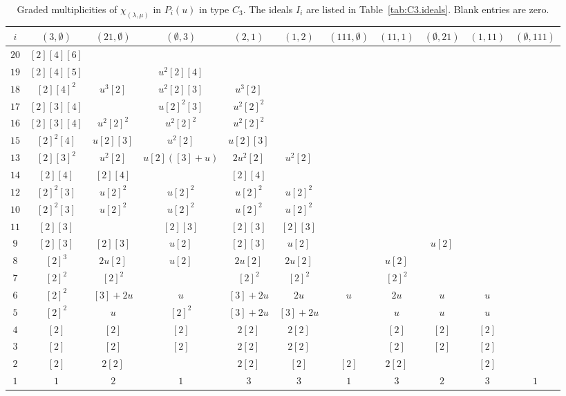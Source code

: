 \documentclass[11pt]{amsart}
\numberwithin{equation}{section}
\theoremstyle{definition}
\begin{document}
\begin{table}%
\centering
\footnotesize
\setlength{\tabcolsep}{2.6pt}
\renewcommand{\arraystretch}{1.2}
\begin{tabular}{@{}c*{10}{c}@{}}
\toprule
$i$&$(3,\emptyset)$&$(21,\emptyset)$&$(\emptyset,3)$&$(2,1)$&$(1,2)$&
$(111,\emptyset)$&$(11,1)$&$(\emptyset,21)$&$(1,11)$&$(\emptyset,111)$\\
\midrule
$20$ & $[2][4][6]$ &  &  &  &  &  &  &  &  & \\
$19$ & $[2][4][5]$ &  & $u^2[2][4]$ &  &  &  &  &  &  & \\
$18$ & $[2][4]^2$ & $u^3[2]$ & $u^2[2][3]$ & $u^3[2]$ &  &  &  &  &  & \\
$17$ & $[2][3][4]$ &  & $u[2]^2[3]$ & $u^2[2]^2$ &  &  &  &  &  & \\
$16$ & $[2][3][4]$ & $u^2[2]^2$ & $u^2[2]^2$ & $u^2[2]^2$ &  &  &  &  &  & \\
$15$ & $[2]^2[4]$ & $u[2][3]$ & $u^2[2]$ & $u[2][3]$ &  &  &  &  &  & \\
$13$ & $[2][3]^2$ & $u^2[2]$ & $u[2]([3]+u)$ & $2u^2[2]$ & $u^2[2]$ &  &  &  &  & \\
$14$ & $[2][4]$ & $[2][4]$ &  & $[2][4]$ &  &  &  &  &  & \\
$12$ & $[2]^2[3]$ & $u[2]^2$ & $u[2]^2$ & $u[2]^2$ & $u[2]^2$ &  &  &  &  & \\
$10$ & $[2]^2[3]$ & $u[2]^2$ & $u[2]^2$ & $u[2]^2$ & $u[2]^2$ &  &  &  &  & \\
$11$ & $[2][3]$ &  & $[2][3]$ & $[2][3]$ & $[2][3]$ &  &  &  &  & \\
$9$ & $[2][3]$ & $[2][3]$ & $u[2]$ & $[2][3]$ & $u[2]$ &  &  & $u[2]$ &  & \\
$8$ & $[2]^3$ & $2u[2]$ & $u[2]$ & $2u[2]$ & $2u[2]$ &  & $u[2]$ &  &  & \\
$7$ & $[2]^2$ & $[2]^2$ &  & $[2]^2$ & $[2]^2$ &  & $[2]^2$ &  &  & \\
$6$ & $[2]^2$ & $[3]+2u$ & $u$ & $[3]+2u$ & $2u$ & $u$ & $2u$ & $u$ & $u$ & \\
$5$ & $[2]^2$ & $u$ & $[2]^2$ & $[3]+2u$ & $[3]+2u$ &  & $u$ & $u$ & $u$ & \\
$4$ & $[2]$ & $[2]$ & $[2]$ & $2[2]$ & $2[2]$ &  & $[2]$ & $[2]$ & $[2]$ & \\
$3$ & $[2]$ & $[2]$ & $[2]$ & $2[2]$ & $2[2]$ &  & $[2]$ & $[2]$ & $[2]$ & \\
$2$ & $[2]$ & $2[2]$ &  & $2[2]$ & $[2]$ & $[2]$ & $2[2]$ &  & $[2]$ & \\
$1$ & $1$ & $2$ & $1$ & $3$ & $3$ & $1$ & $3$ & $2$ & $3$ & $1$\\
\bottomrule
\end{tabular}
\par
\vspace{8pt}
\caption{Graded multiplicities of $\chi_{(\lambda,\mu)}$ in $P_i(u)$ in type $C_3$.
The ideals $I_i$ are listed in Table~\ref{tab:C3.ideals}.
Blank entries are zero.}
\label{fig C3}
\end{table}
\end{document}
